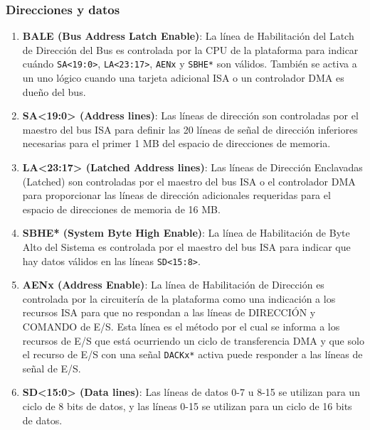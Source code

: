 \documentclass[12pt]{article}
\begin{document}
	\subsubsection*{Direcciones y datos}
	\begin{enumerate}
		\item \textbf{BALE (Bus Address Latch Enable)}: La línea de Habilitación del Latch de Dirección del Bus es controlada por la CPU de la plataforma para indicar cuándo \texttt{SA<19:0>}, \texttt{LA<23:17>}, \texttt{AENx} y \texttt{SBHE*} son válidos. También se activa a un uno lógico cuando una tarjeta adicional ISA o un controlador DMA es dueño del bus.
		
		\item \textbf{SA<19:0> (Address lines)}: Las líneas de dirección son controladas por el maestro del bus ISA para definir las 20 líneas de señal de dirección inferiores necesarias para el primer 1 MB del espacio de direcciones de memoria.
		
		\item \textbf{LA<23:17> (Latched Address lines)}: Las líneas de Dirección Enclavadas (Latched) son controladas por el maestro del bus ISA o el controlador DMA para proporcionar las líneas de dirección adicionales requeridas para el espacio de direcciones de memoria de 16 MB.
		
		\item \textbf{SBHE* (System Byte High Enable)}: La línea de Habilitación de Byte Alto del Sistema es controlada por el maestro del bus ISA para indicar que hay datos válidos en las líneas \texttt{SD<15:8>}.
		
		\item \textbf{AENx (Address Enable)}: La línea de Habilitación de Dirección es controlada por la circuitería de la plataforma como una indicación a los recursos ISA para que no respondan a las líneas de DIRECCIÓN y COMANDO de E/S. Esta línea es el método por el cual se informa a los recursos de E/S que está ocurriendo un ciclo de transferencia DMA y que solo el recurso de E/S con una señal \texttt{DACKx*} activa puede responder a las líneas de señal de E/S.
		
		\item \textbf{SD<15:0> (Data lines)}: Las líneas de datos 0-7 u 8-15 se utilizan para un ciclo de 8 bits de datos, y las líneas 0-15 se utilizan para un ciclo de 16 bits de datos.
	\end{enumerate}
	
\end{document}
